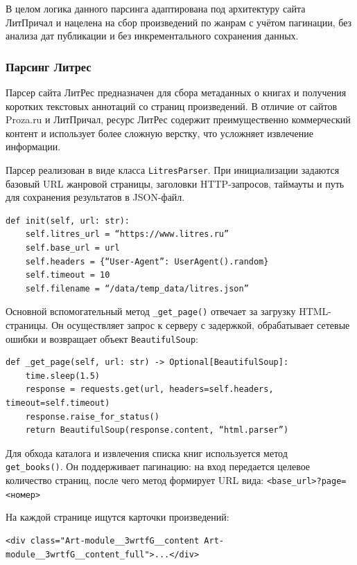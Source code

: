 \documentclass[coursework]{SCWorks}
\begin{document}
    В целом логика данного парсинга адаптирована под архитектуру сайта ЛитПричал и нацелена на сбор произведений по жанрам
    с учётом пагинации, без анализа дат публикации и без инкрементального сохранения данных.

    \subsubsection{Парсинг Литрес}

    Парсер сайта ЛитРес предназначен для сбора метаданных о книгах и получения коротких текстовых аннотаций со страниц произведений.
    В отличие от сайтов Proza.ru и ЛитПричал, ресурс ЛитРес содержит преимущественно коммерческий контент и использует более сложную верстку,
    что усложняет извлечение информации.

    Парсер реализован в виде класса \texttt{LitresParser}.
    При инициализации задаются базовый URL жанровой страницы, заголовки HTTP-запросов, таймауты и путь для сохранения результатов в JSON-файл.

    \begin{verbatim}
def init(self, url: str):
    self.litres_url = “https://www.litres.ru”
    self.base_url = url
    self.headers = {“User-Agent”: UserAgent().random}
    self.timeout = 10
    self.filename = “/data/temp_data/litres.json”
    \end{verbatim}

    Основной вспомогательный метод \texttt{\_get\_page()} отвечает за загрузку HTML-страницы.
    Он осуществляет запрос к серверу с задержкой, обрабатывает сетевые ошибки и возвращает объект \texttt{BeautifulSoup}:

    \begin{verbatim}
def _get_page(self, url: str) -> Optional[BeautifulSoup]:
    time.sleep(1.5)
    response = requests.get(url, headers=self.headers, timeout=self.timeout)
    response.raise_for_status()
    return BeautifulSoup(response.content, “html.parser”)
    \end{verbatim}

    Для обхода каталога и извлечения списка книг используется метод \\ \texttt{get\_books()}.
    Он поддерживает пагинацию: на вход передается целевое количество страниц, после чего метод формирует URL вида: \texttt{<base\_url>?page=<номер>}

    На каждой странице ищутся карточки произведений:

    \begin{verbatim}
<div class="Art-module__3wrtfG__content Art-module__3wrtfG__content_full">...</div>
    \end{verbatim}
\end{document}
